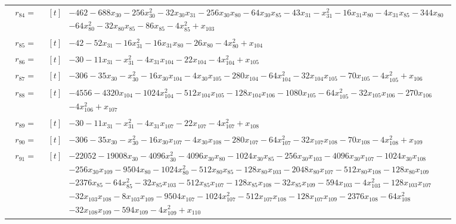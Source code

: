 \begin{longtable}{@{}r p{0.92\linewidth}@{}}
$r_{84}=$ & $\begin{aligned}[t]&-462-688x_{30}-256x_{30}^{2}-32x_{30}x_{31}-256x_{30}x_{80}-64x_{30}x_{85}-43x_{31}-x_{31}^{2}-16x_{31}x_{80}-4x_{31}x_{85}-344x_{80}\\[-1pt] &-64x_{80}^{2}-32x_{80}x_{85}-86x_{85}-4x_{85}^{2}+x_{103}\end{aligned}$ \\[2pt]
$r_{85}=$ & $\begin{aligned}[t]&-42-52x_{31}-16x_{31}^{2}-16x_{31}x_{80}-26x_{80}-4x_{80}^{2}+x_{104}\end{aligned}$ \\[2pt]
$r_{86}=$ & $\begin{aligned}[t]&-30-11x_{31}-x_{31}^{2}-4x_{31}x_{104}-22x_{104}-4x_{104}^{2}+x_{105}\end{aligned}$ \\[2pt]
$r_{87}=$ & $\begin{aligned}[t]&-306-35x_{30}-x_{30}^{2}-16x_{30}x_{104}-4x_{30}x_{105}-280x_{104}-64x_{104}^{2}-32x_{104}x_{105}-70x_{105}-4x_{105}^{2}+x_{106}\end{aligned}$ \\[2pt]
$r_{88}=$ & $\begin{aligned}[t]&-4556-4320x_{104}-1024x_{104}^{2}-512x_{104}x_{105}-128x_{104}x_{106}-1080x_{105}-64x_{105}^{2}-32x_{105}x_{106}-270x_{106}\\[-1pt] &-4x_{106}^{2}+x_{107}\end{aligned}$ \\[2pt]
$r_{89}=$ & $\begin{aligned}[t]&-30-11x_{31}-x_{31}^{2}-4x_{31}x_{107}-22x_{107}-4x_{107}^{2}+x_{108}\end{aligned}$ \\[2pt]
$r_{90}=$ & $\begin{aligned}[t]&-306-35x_{30}-x_{30}^{2}-16x_{30}x_{107}-4x_{30}x_{108}-280x_{107}-64x_{107}^{2}-32x_{107}x_{108}-70x_{108}-4x_{108}^{2}+x_{109}\end{aligned}$ \\[2pt]
$r_{91}=$ & $\begin{aligned}[t]&-22052-19008x_{30}-4096x_{30}^{2}-4096x_{30}x_{80}-1024x_{30}x_{85}-256x_{30}x_{103}-4096x_{30}x_{107}-1024x_{30}x_{108}\\[-1pt] &-256x_{30}x_{109}-9504x_{80}-1024x_{80}^{2}-512x_{80}x_{85}-128x_{80}x_{103}-2048x_{80}x_{107}-512x_{80}x_{108}-128x_{80}x_{109}\\[-1pt] &-2376x_{85}-64x_{85}^{2}-32x_{85}x_{103}-512x_{85}x_{107}-128x_{85}x_{108}-32x_{85}x_{109}-594x_{103}-4x_{103}^{2}-128x_{103}x_{107}\\[-1pt] &-32x_{103}x_{108}-8x_{103}x_{109}-9504x_{107}-1024x_{107}^{2}-512x_{107}x_{108}-128x_{107}x_{109}-2376x_{108}-64x_{108}^{2}\\[-1pt] &-32x_{108}x_{109}-594x_{109}-4x_{109}^{2}+x_{110}\end{aligned}$ \\[2pt]

\end{longtable}
